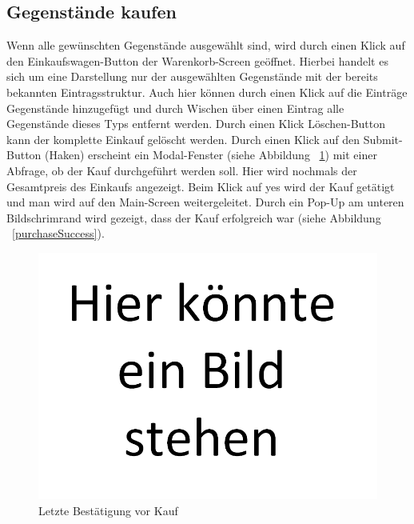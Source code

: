 \documentclass{scrartcl}
\begin{document}
	\subsection{Gegenstände kaufen}\label{subsec:gegenstände-kaufen}

	Wenn alle gewünschten Gegenstände ausgewählt sind, wird durch einen Klick auf den Einkaufswagen-Button der Warenkorb-Screen geöffnet.
	Hierbei handelt es sich um eine Darstellung nur der ausgewählten Gegenstände mit der bereits bekannten Eintragsstruktur.
	Auch hier können durch einen Klick auf die Einträge Gegenstände hinzugefügt und durch Wischen über einen Eintrag alle Gegenstände dieses Typs entfernt werden.
	Durch einen Klick Löschen-Button kann der komplette Einkauf gelöscht werden.
	Durch einen Klick auf den Submit-Button (Haken) erscheint ein Modal-Fenster (siehe Abbildung ~\ref{shoppingCartCheck}) mit einer Abfrage, ob der Kauf durchgeführt werden soll.
	Hier wird nochmals der Gesamtpreis des Einkaufs angezeigt.
	Beim Klick auf \glqq yes\grqq{} wird der Kauf getätigt und man wird auf den Main-Screen weitergeleitet.
	Durch ein Pop-Up am unteren Bildschrimrand wird gezeigt, dass der Kauf erfolgreich war (siehe Abbildung ~\ref{purchaseSuccess}).

	\begin{figure}[!h]
		\centering
		\includegraphics[scale=0.5]{./figures/placeholder.png}
		\caption{Letzte Bestätigung vor Kauf}
		\label{shoppingCartCheck}
	\end{figure}
\end{document}
